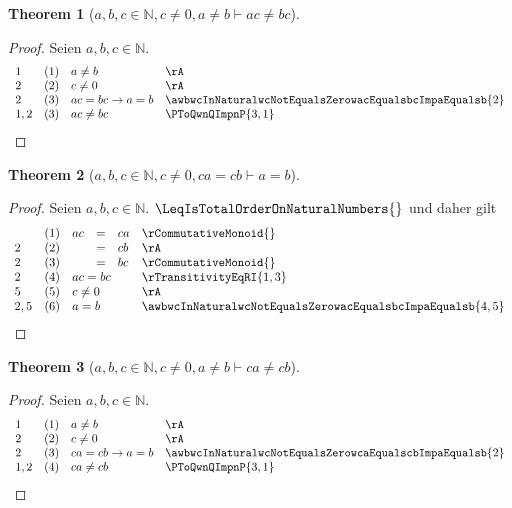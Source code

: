 \documentclass{book}
\theoremstyle{plain}
\newtheorem{theorem}{Theorem}
\theoremstyle{remark}
\theoremstyle{definition}
\begin{document}
\label{awbwcInNaturalwcNotEqualsZerowaNotEqualsbImpacNotEqualsbc}
\begin{theorem}[\(a,b,c\in\mathbb{N},c\neq 0,a\neq b\vdash ac\neq bc\)]
\end{theorem}
\begin{proof}
        Seien \(a,b,c\in\mathbb{N}\).
        \[
	\begin{array}{llclll}
            1       &  (1)  & \multicolumn{3}{l}{a\neq b} & \rA \\
            2       &  (2)  & \multicolumn{3}{l}{c\neq 0} & \rA \\
            2       &  (3)  & \multicolumn{3}{l}{ac=bc\rightarrow a=b} & \awbwcInNaturalwcNotEqualsZerowacEqualsbcImpaEqualsb{2} \\
            1,2       &  (3)  & \multicolumn{3}{l}{ac\neq bc} & \PToQwnQImpnP{3,1} \\  
	\end{array}
	\]
\end{proof}

\label{awbwcInNaturalwcNotEqualsZerowcaEqualscbImpaEqualsb}
\begin{theorem}[\(a,b,c\in\mathbb{N},c\neq 0,ca=cb\vdash a=b\)]
\end{theorem}
\begin{proof}
        Seien \(a,b,c\in\mathbb{N}\). \(\LeqIsTotalOrderOnNaturalNumbers{}\) und daher gilt
        \[
	\begin{array}{llclll}
                    &  (1)  & ac&=&ca & \rCommutativeMonoid{} \\
                2   &  (2)  & &=&cb & \rA \\
                2   &  (3)  & &=&bc & \rCommutativeMonoid{} \\
                2   &  (4)  &\multicolumn{3}{l}{ac=bc} & \rTransitivityEqRI{1,3} \\
                5   &  (5)  &\multicolumn{3}{l}{c\neq 0} & \rA \\
                2,5 &  (6)  &\multicolumn{3}{l}{a=b} & \awbwcInNaturalwcNotEqualsZerowacEqualsbcImpaEqualsb{4,5} \\
	\end{array}
	\]
\end{proof}

\label{awbwcInNaturalwcNotEqualsZerowaNotEqualsbImpcaNotEqualscb}
\begin{theorem}[\(a,b,c\in\mathbb{N},c\neq 0,a\neq b\vdash ca\neq cb\)]
\end{theorem}
\begin{proof}
        Seien \(a,b,c\in\mathbb{N}\).
        \[
	\begin{array}{llclll}
            1       &  (1)  & \multicolumn{3}{l}{a\neq b} & \rA \\
            2       &  (2)  & \multicolumn{3}{l}{c\neq 0} & \rA \\
            2       &  (3)  & \multicolumn{3}{l}{ca=cb\rightarrow a=b} & \awbwcInNaturalwcNotEqualsZerowcaEqualscbImpaEqualsb{2} \\
            1,2     &  (4)  & \multicolumn{3}{l}{ca\neq cb} & \PToQwnQImpnP{3,1} \\  
	\end{array}
	\]
\end{proof}
\end{document}
